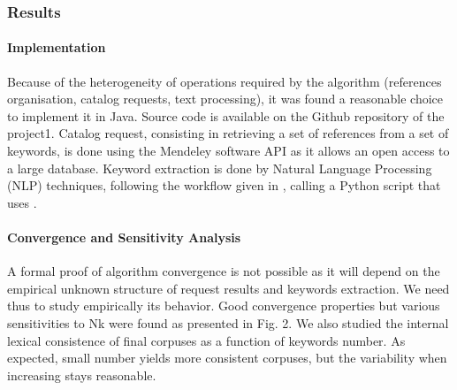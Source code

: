 \subsubsection{Results}

\paragraph{Implementation}

Because of the heterogeneity of operations required by the algorithm (references organisation, catalog requests, text processing), it was found a reasonable choice to implement it in Java. Source code is available on the Github repository of the project1. Catalog request, consisting in retrieving a set of references from a set of keywords, is done using the Mendeley software API \cite{mendeley} as it allows an open access to a large database. Keyword extraction is done by Natural Language Processing (NLP) techniques, following the workflow given in \cite{chavalarias2013phylomemetic}, calling a Python script that uses \cite{bird2006nltk}.


\paragraph{Convergence and Sensitivity Analysis}

A formal proof of algorithm convergence is not possible as it will depend on the empirical unknown structure of request results and keywords extraction. We need thus to study empirically its behavior. Good convergence properties but various sensitivities to Nk were found as presented in Fig. 2. We also studied the internal lexical consistence of final corpuses as a function of keywords number. As expected, small number yields more consistent corpuses, but the variability when increasing stays reasonable.


